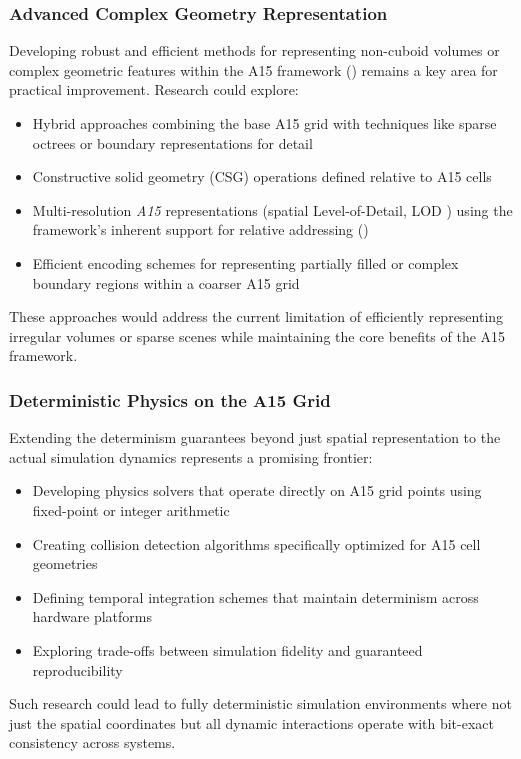 \documentclass[10pt]{article}
\def\AAAB{\textit{A15}}
\begin{document}
\subsubsection{Advanced Complex Geometry Representation}\label{subsubsec-outlook-complex}
Developing robust and efficient methods for representing non-cuboid volumes or complex geometric features within the A15 framework () remains a key area for practical improvement. Research could explore:
\begin{itemize} \itemsep0pt
    \item Hybrid approaches combining the base A15 grid with techniques like sparse octrees or boundary representations for detail
    \item Constructive solid geometry (CSG) operations defined relative to A15 cells
    \item Multi-resolution \AAAB{} representations (spatial Level-of-Detail, LOD \cite{Luebke2002}) using the framework's inherent support for relative addressing ()
    \item Efficient encoding schemes for representing partially filled or complex boundary regions within a coarser A15 grid
\end{itemize}
These approaches would address the current limitation of efficiently representing irregular volumes or sparse scenes while maintaining the core benefits of the A15 framework.

\subsubsection{Deterministic Physics on the A15 Grid}\label{subsubsec-outlook-physics}
Extending the determinism guarantees beyond just spatial representation to the actual simulation dynamics represents a promising frontier:
\begin{itemize} \itemsep0pt
    \item Developing physics solvers that operate directly on A15 grid points using fixed-point or integer arithmetic
    \item Creating collision detection algorithms specifically optimized for A15 cell geometries
    \item Defining temporal integration schemes that maintain determinism across hardware platforms
    \item Exploring trade-offs between simulation fidelity and guaranteed reproducibility
\end{itemize}
Such research could lead to fully deterministic simulation environments where not just the spatial coordinates but all dynamic interactions operate with bit-exact consistency across systems.
\end{document}

